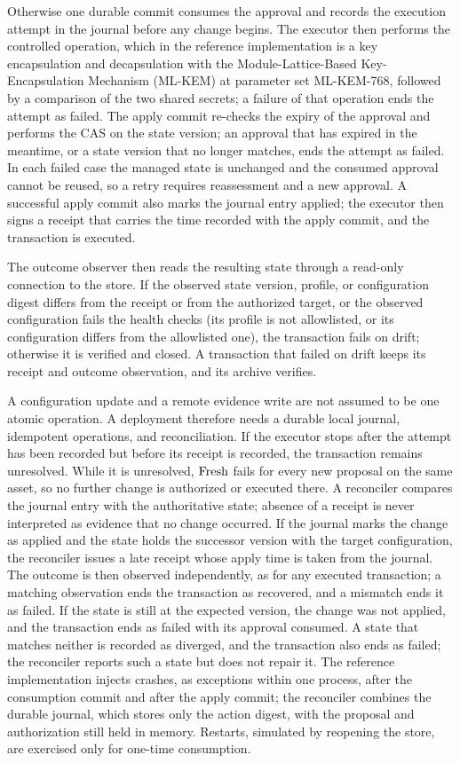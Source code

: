 Otherwise one durable commit consumes the approval and records the execution attempt in the journal before any change begins. The executor then performs the controlled operation, which in the reference implementation is a key encapsulation and decapsulation with the Module-Lattice-Based Key-Encapsulation Mechanism (ML-KEM) at parameter set ML-KEM-768, followed by a comparison of the two shared secrets; a failure of that operation ends the attempt as failed. The apply commit re-checks the expiry of the approval and performs the CAS on the state version; an approval that has expired in the meantime, or a state version that no longer matches, ends the attempt as failed. In each failed case the managed state is unchanged and the consumed approval cannot be reused, so a retry requires reassessment and a new approval. A successful apply commit also marks the journal entry applied; the executor then signs a receipt that carries the time recorded with the apply commit, and the transaction is executed.

The outcome observer then reads the resulting state through a read-only connection to the store. If the observed state version, profile, or configuration digest differs from the receipt or from the authorized target, or the observed configuration fails the health checks (its profile is not allowlisted, or its configuration differs from the allowlisted one), the transaction fails on drift; otherwise it is verified and closed. A transaction that failed on drift keeps its receipt and outcome observation, and its archive verifies.

A configuration update and a remote evidence write are not assumed to be one atomic operation. A deployment therefore needs a durable local journal, idempotent operations, and reconciliation. If the executor stops after the attempt has been recorded but before its receipt is recorded, the transaction remains unresolved. While it is unresolved, $\mathrm{Fresh}$ fails for every new proposal on the same asset, so no further change is authorized or executed there. A reconciler compares the journal entry with the authoritative state; absence of a receipt is never interpreted as evidence that no change occurred. If the journal marks the change as applied and the state holds the successor version with the target configuration, the reconciler issues a late receipt whose apply time is taken from the journal. The outcome is then observed independently, as for any executed transaction; a matching observation ends the transaction as recovered, and a mismatch ends it as failed. If the state is still at the expected version, the change was not applied, and the transaction ends as failed with its approval consumed. A state that matches neither is recorded as diverged, and the transaction also ends as failed; the reconciler reports such a state but does not repair it. The reference implementation injects crashes, as exceptions within one process, after the consumption commit and after the apply commit; the reconciler combines the durable journal, which stores only the action digest, with the proposal and authorization still held in memory. Restarts, simulated by reopening the store, are exercised only for one-time consumption.

